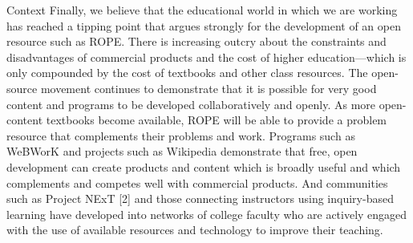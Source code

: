 \documentclass[11pt]{article}
\begin{document}
\begin{section}{Context}
Finally, we believe that the educational world in which we are working has
reached a tipping point that argues strongly for the development of an open
resource such as ROPE.  There is increasing outcry about the constraints
and disadvantages of commercial products and the cost of higher
education---which is only compounded by the cost of textbooks and other
class resources.  The open-source movement continues to demonstrate that
it is possible for very good content and programs to be
developed collaboratively and openly.  %
As more
open-content textbooks become available, ROPE will be able to provide a
problem resource that complements their problems and work.  Programs such
as WeBWorK and projects such as Wikipedia demonstrate that free, open
development can create products and content which is broadly useful and
which complements and competes well with commercial products.  And
communities such as Project NExT [2] and those connecting instructors
using inquiry-based learning have developed into networks of
college faculty who are actively engaged with the use of available
resources and technology to improve their teaching.

\end{section}
\end{document}
